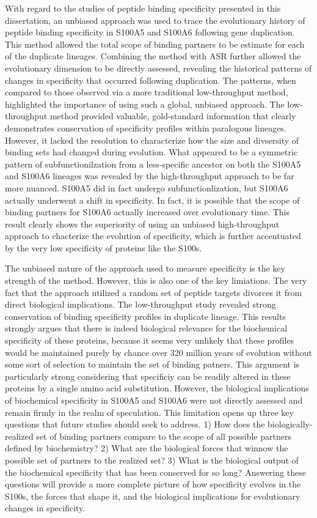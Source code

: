 With regard to the studies of peptide binding specificity presented
in this dissertation, an unbiased approach was used to trace the evolutionary
history of peptide binding specificity in S100A5 and S100A6 following
gene duplication. This method allowed the total scope of binding partners
to be estimate for each of the duplicate lineages. Combining the method
with ASR further allowed the evolutionary dimension to be directly
assessed, revealing the historical patterns of changes in specificity
that occurred following duplication. The patterns, when compared to
those observed via a more traditional low-throughput method, highlighted
the importance of using such a global, unbiased approach. The low-throughput
method provided valuable, gold-standard information that clearly demonstrates
conservation of specificity profiles within paralogous lineages. However,
it lacked the resolution to characterize how the size and divsersity
of binding sets had changed during evolution. What appeared to be
a symmetric pattern of subfunctionilzation from a less-specific ancestor
on both the S100A5 and S100A6 lineages was revealed by the high-throughput
approach to be far more nuanced. S100A5 did in fact undergo subfunctionlization,
but S100A6 actually underwent a shift in specificity. In fact, it
is possible that the scope of binding partners for S100A6 actually
increased over evolutionary time. This result clearly shows the superiority
of using an unbiased high-throughput approach to chacterize the evolution
of specificity, which is further accentuated by the very low specificity
of proteins like the S100s. 

The unbiased nature of the approach used to measure specificity is
the key strength of the method. However, this is also one of the key
limiations. The very fact that the approach utilized a random set
of peptide targets divorces it from direct biological implications.
The low-throughput study revealed strong conservation of binding specificity
profiles in duplicate lineage. This results strongly argues that there
is indeed biological relevance for the biochemical specificity of
these proteins, because it seems very unlikely that these profiles
would be maintained purely by chance over 320 million years of evolution
without some sort of selection to maintain the set of binding patners.
This argument is particularly strong considering that specificiy can
be readily altered in these proteins by a single amino acid substitution.
However, the biological implications of biochemical specificity in
S100A5 and S100A6 were not directly assessed and remain firmly in
the realm of speculation. This limitation opens up three key questions
that future studies should seek to address. 1) How does the biologically-realized
set of binding partners compare to the scope of all possible partners
defined by biochemistry? 2) What are the biological forces that winnow
the possible set of partners to the realized set? 3) What is the biological
output of the biochemical specificity that has been conserved for
so long? Answering these questions will provide a more complete picture
of how specificity evolves in the S100s, the forces that shape it,
and the biological implications for evolutionary changes in specificity. 




